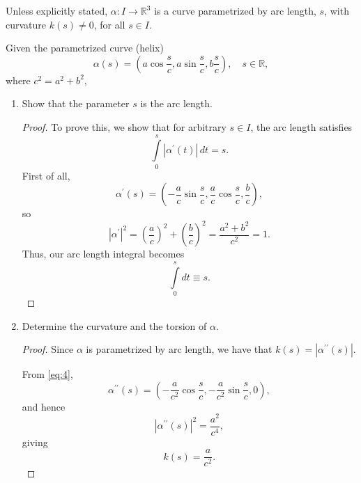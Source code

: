 \documentclass[12pt]{article}
\newenvironment{problem}[2][Problem]{\begin{trivlist}
    \item[\hskip \labelsep {\bfseries #1}\hskip \labelsep {\bfseries #2.}]}{\end{trivlist}}
\theoremstyle{definition}
\begin{document}
Unless explicitly stated, \(\alpha: I \rightarrow \mathbb{R}^3\) is a curve parametrized by arc length, \( s \), with curvature \( k(s) \neq 0 \), for all \( s \in I \).

\begin{problem}{1.5.1}
  Given the parametrized curve (helix)
  \begin{equation}
  \label{eq:1}
  \alpha(s) = \left( a \cos \frac{s}{c}, a \sin \frac{s}{c}, b \frac{s}{c} \right), \quad s \in \mathbb{R},
  \end{equation}
  where \( c^2 = a^2 + b^2 \),

  \begin{enumerate}[label=(\alph*)]
    \item Show that the parameter \( s \) is the arc length.
          \begin{proof}
            To prove this, we show that for arbitrary \( s \in I \), the arc length satisfies
            \begin{equation}
            \label{eq:3}
            \int\limits_0^s \left| \alpha^{\prime}(t) \right| \,dt = s.
            \end{equation}
            First of all,
            \begin{equation}
            \label{eq:4}
            \alpha^{\prime}(s) = \left( -\frac{a}{c}\sin \frac{s}{c}, \frac{a}{c}\cos \frac{s}{c}, \frac{b}{c} \right),
            \end{equation}
            so
            \begin{equation}
            \label{eq:5}
            \left| \alpha^{\prime} \right|^2 = \left( \frac{a}{c} \right)^2 + \left( \frac{b}{c} \right)^2 = \frac{a^2 + b^2}{c^2} = 1.
            \end{equation}
            Thus, our arc length integral becomes
            \begin{equation}
            \label{eq:6}
            \int\limits_0^s dt \equiv s.
            \end{equation}
          \end{proof}
    \item Determine the curvature and the torsion of \(\alpha\).
          \begin{proof}
            Since \(\alpha\) is parametrized by arc length, we have that \( k(s) = \left| \alpha^{\prime\prime}(s) \right| \).

            From \cref{eq:4},
            \begin{equation}
            \label{eq:7}
            \alpha^{\prime\prime}(s) = \left( - \frac{a}{c^2}\cos \frac{s}{c}, - \frac{a}{c^2}\sin \frac{s}{c}, 0 \right),
            \end{equation}
            and hence
            \begin{equation}
            \label{eq:8}
            \left| \alpha^{\prime\prime}(s) \right|^2 = \frac{a^2}{c^{4}},
            \end{equation}
            giving
            \begin{equation}
            \label{eq:9}
            \boxed{k(s) = \frac{a}{c^2}}.
            \end{equation}


\end{proof}
\end{enumerate}
\end{problem}
\end{document}

